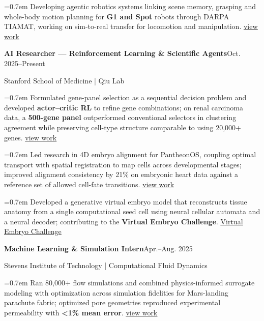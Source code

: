 \documentclass[10pt,letterpaper]{article}
\begin{document}
\hangindent=0.7em \textbullet{} Developing agentic robotics systems linking scene memory, grasping and whole-body motion planning for \textbf{G1 and Spot} robots through DARPA TIAMAT, working on sim-to-real transfer for locomotion and manipulation. \href{https://rwin2.github.io/erwinpoussi.github.io/project/gait-manip/}{\underline{view work}}\par
\vspace{2pt}\textbf{AI Researcher --- Reinforcement Learning \& Scientific Agents}\hfill Oct. 2025--Present\par
Stanford School of Medicine | Qiu Lab\par
\hangindent=0.7em \textbullet{} Formulated gene-panel selection as a sequential decision problem and developed \textbf{actor--critic RL} to refine gene combinations; on renal carcinoma data, a \textbf{500-gene panel} outperformed conventional selectors in clustering agreement while preserving cell-type structure comparable to using 20,000+ genes. \href{https://rwin2.github.io/erwinpoussi.github.io/project/learning-optimal-gene-panels-with-reinforcement-learning/}{\underline{view work}}\par
\hangindent=0.7em \textbullet{} Led research in 4D embryo alignment for PantheonOS, coupling optimal transport with spatial registration to map cells across developmental stages; improved alignment consistency by 21\% on embryonic heart data against a reference set of allowed cell-fate transitions. \href{https://rwin2.github.io/erwinpoussi.github.io/project/pantheon-gene-panel-selection/}{\underline{view work}}\par
\hangindent=0.7em \textbullet{} Developed a generative virtual embryo model that reconstructs tissue anatomy from a single computational seed cell using neural cellular automata and a neural decoder; contributing to the \textbf{Virtual Embryo Challenge}. \href{https://rwin2.github.io/erwinpoussi.github.io/project/virtual-embryo/}{\underline{Virtual Embryo Challenge}}\par
\vspace{2pt}\textbf{Machine Learning \& Simulation Intern}\hfill Apr.--Aug. 2025\par
Stevens Institute of Technology | Computational Fluid Dynamics\par
\hangindent=0.7em \textbullet{} Ran 80,000+ flow simulations and combined physics-informed surrogate modeling with optimization across simulation fidelities for Mars-landing parachute fabric; optimized pore geometries reproduced experimental permeability with \textbf{\textless{}1\% mean error}. \href{https://rwin2.github.io/erwinpoussi.github.io/project/parachute-opt/}{\underline{view work}}\par
\end{document}
